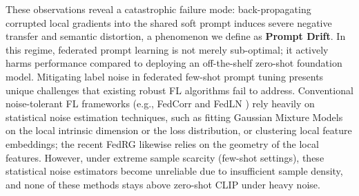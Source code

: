 \documentclass[runningheads]{llncs}
\begin{document}

These observations reveal a catastrophic failure mode: back-propagating corrupted local
gradients into the shared soft prompt induces severe negative transfer and semantic distortion, a
phenomenon we define as \textbf{Prompt Drift}. In this regime, federated prompt learning is not merely
sub-optimal; it actively harms performance compared to deploying an off-the-shelf zero-shot foundation
model. Mitigating label noise in federated few-shot prompt tuning presents unique challenges that
existing robust FL algorithms fail to address. Conventional noise-tolerant FL frameworks (e.g.,
FedCorr \cite{xu2022fedcorr} and FedLN \cite{tsouvalas2022federated}) rely heavily on statistical noise
estimation techniques, such as fitting Gaussian Mixture Models on the local intrinsic dimension or
the loss distribution, or clustering local feature embeddings; the recent FedRG \cite{wen2026fedrg}
likewise relies on the geometry of the local features. However, under extreme sample scarcity
(few-shot settings), these statistical noise estimators become unreliable due to insufficient sample
density, and none of these methods stays above zero-shot CLIP under heavy noise.
\end{document}

